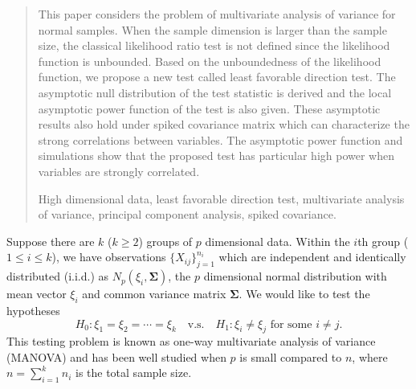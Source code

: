 \documentclass[12pt]{article} %
\renewcommand{\theequation}{\thesection\arabic{equation}}
\newcommand{\bfsym}[1]{\ensuremath{\boldsymbol{#1}}}
\def\bSigma {\bfsym {\Sigma}}
\theoremstyle{definition}
\begin{document}
\begin{quotation}
This paper considers the problem of multivariate analysis of variance for normal samples.
    When the sample dimension is larger than the sample size, the classical likelihood ratio test is not defined since the likelihood function is unbounded.
    Based on the unboundedness of the likelihood function, we propose a new test called least favorable direction test.
    The asymptotic null distribution of the test statistic is derived and the local asymptotic power function of the test is also given.
    These asymptotic results also hold under spiked covariance matrix which can characterize the strong correlations between variables.
    The asymptotic power function and simulations show that the proposed test has particular high power when variables are strongly correlated.

\vspace{9pt}
    High dimensional data, least favorable direction test, multivariate analysis of variance, principal component analysis, spiked covariance.
\par
\end{quotation}\par



\def\thefigure{\arabic{figure}}
\def\thetable{\arabic{table}}

\renewcommand{\theequation}{\thesection.\arabic{equation}}


\fontsize{12}{14pt plus.8pt minus .6pt}\selectfont

\setcounter{section}{1} %
\setcounter{equation}{0} %

Suppose there are $k$ ($k\geq 2$) groups of $p$ dimensional data.
Within the $i$th group ($1\leq i\leq k$), we have observations $\{X_{ij}\}_{j=1}^{n_i}$ which are independent and identically distributed (i.i.d.) as $N_p(\xi_i,\bSigma)$, the $p$ dimensional normal distribution with mean vector $\xi_i$ and common variance matrix $\bSigma$.
We would like to test the hypotheses
\begin{equation}\label{hypothesis}
    H_0: \xi_1=\xi_2=\cdots=\xi_k\quad \text{v.s.}\quad　H_1: \text{$\xi_i\neq \xi_j$ for some $i\neq j$}.
\end{equation}
This testing problem is known as one-way multivariate analysis of variance (MANOVA) and has been well studied when $p$ is small compared to $n$, where $n=\sum_{i=1}^k n_i$ is the total sample size.
\end{document}
